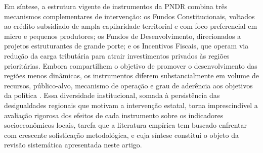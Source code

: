 Em síntese, a estrutura vigente de instrumentos da PNDR combina três mecanismos complementares de intervenção: os Fundos Constitucionais, voltados ao crédito subsidiado de ampla capilaridade territorial e com foco preferencial em micro e pequenos produtores; os Fundos de Desenvolvimento, direcionados a projetos estruturantes de grande porte; e os Incentivos Fiscais, que operam via redução da carga tributária para atrair investimentos privados às regiões prioritárias. Embora compartilhem o objetivo de promover o desenvolvimento das regiões menos dinâmicas, os instrumentos diferem substancialmente em volume de recursos, público-alvo, mecanismo de operação e grau de aderência aos objetivos da política \cite{Portugal2020, Portugal2024}. Essa diversidade institucional, somada à persistência das desigualdades regionais que motivam a intervenção estatal, torna imprescindível a avaliação rigorosa dos efeitos de cada instrumento sobre os indicadores socioeconômicos locais, tarefa que a literatura empírica tem buscado enfrentar com crescente sofisticação metodológica, e cuja síntese constitui o objeto da revisão sistemática apresentada neste artigo.
